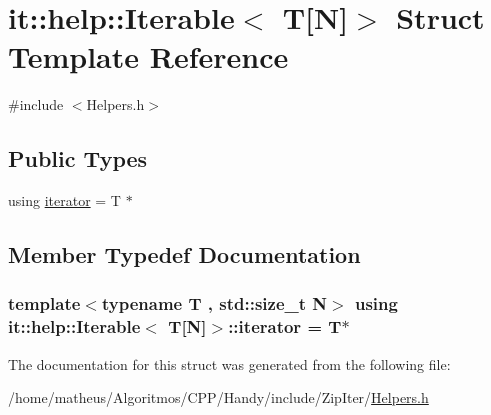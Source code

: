 \hypertarget{structit_1_1help_1_1Iterable_3_01T[N]_4}{}\section{it\+:\+:help\+:\+:Iterable$<$ T\mbox{[}N\mbox{]}$>$ Struct Template Reference}
\label{structit_1_1help_1_1Iterable_3_01T[N]_4}


{\ttfamily \#include $<$Helpers.\+h$>$}

\subsection*{Public Types}
\begin{DoxyCompactItemize}
\item 
using \hyperlink{structit_1_1help_1_1Iterable_3_01T[N]_4_a36024509bbcde977155c3c244a5fa219}{iterator} = T $\ast$
\end{DoxyCompactItemize}


\subsection{Member Typedef Documentation}
\subsubsection[{\texorpdfstring{iterator}{iterator}}]{\setlength{\rightskip}{0pt plus 5cm}template$<$typename T , std\+::size\+\_\+t N$>$ using {\bf it\+::help\+::\+Iterable}$<$ T\mbox{[}N\mbox{]}$>$\+::{\bf iterator} =  T$\ast$}\hypertarget{structit_1_1help_1_1Iterable_3_01T[N]_4_a36024509bbcde977155c3c244a5fa219}{}\label{structit_1_1help_1_1Iterable_3_01T[N]_4_a36024509bbcde977155c3c244a5fa219}


The documentation for this struct was generated from the following file\+:\begin{DoxyCompactItemize}
\item 
/home/matheus/\+Algoritmos/\+C\+P\+P/\+Handy/include/\+Zip\+Iter/\hyperlink{ZipIter_2Helpers_8h}{Helpers.\+h}\end{DoxyCompactItemize}
